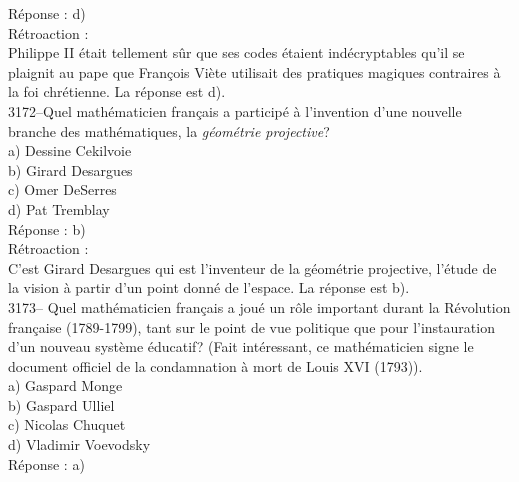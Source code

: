\documentclass[letterpaper, 12pt]{article}
\begin{document}
R\'eponse : d)\\

R\'etroaction :\\
Philippe II \'etait tellement s\^ur que ses codes \'etaient ind\'ecryptables qu'il se plaignit au pape que Fran\c cois Vi\`ete utilisait des pratiques magiques contraires \`a la foi chr\'etienne. La r\'eponse est d).\\



3172--Quel math\'ematicien fran\c cais a particip\'e \`a l'invention d'une nouvelle branche des math\'ematiques, la \emph{g\'eom\'etrie projective}?\\

a) Dessine Cekilvoie\\
b) Girard Desargues\\
c) Omer DeSerres\\
d) Pat Tremblay\\

R\'eponse : b)\\

R\'etroaction :\\
C'est Girard Desargues qui est l'inventeur de la g\'eom\'etrie projective, l'\'etude de la vision \`a partir d'un point donn\'e de l'espace. La r\'eponse est b).\\



3173-- Quel math\'ematicien fran\c cais a jou\'e un r\^ole important durant la R\'evolution fran\c caise (1789-1799), tant sur le point de vue politique que pour l'instauration d'un nouveau syst\`eme \'educatif? (Fait int\'eressant, ce math\'ematicien signe le document officiel de la condamnation \`a mort de Louis XVI (1793)).\\

a) Gaspard Monge\\
b) Gaspard Ulliel\\
c) Nicolas Chuquet\\
d) Vladimir Voevodsky\\

R\'eponse : a)\\
\end{document}
